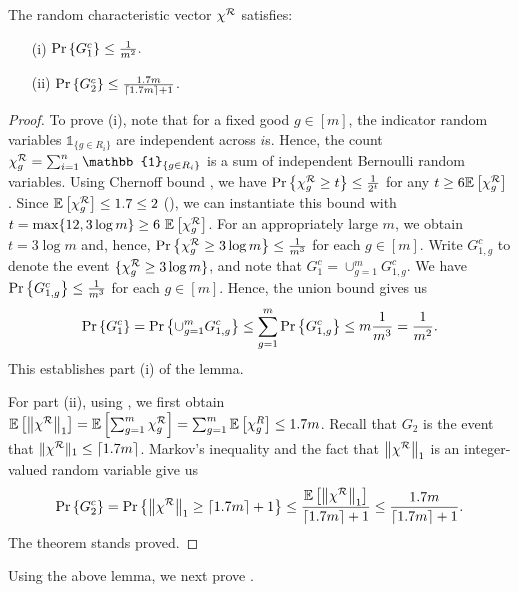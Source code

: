 \begin{lemma}
\label{lem:linftynormforb} 
The random characteristic vector $\chi^{\mathcal{R}}$ satisfies: 
\begin{enumerate}
    \item[(i)] $\Pr \left\{G_1^c\right\} \leq \frac{1}{m^{2}}.$
    \item[(ii)] $\Pr \left\{G_2^c\right\} \leq \frac{1.7m}{ \lceil1.7m\rceil+1}$.
\end{enumerate}
\end{lemma}
\begin{proof} 
To prove (i), note that for a fixed good $g\in [m]$, the indicator random variables $\mathbb{1}_{\{g\in R_i\}}$ are independent across $i$s. Hence, the count $\chi^\calR_g=\sum_{i=1}^n \mathbb{1}_{\{g\in R_i\}}$ is a sum of independent Bernoulli random variables. Using Chernoff bound \cite[Theorem 4.4]{mitzenmacher2017probability}, we have $\Pr \left\{\chi^{\mathcal{R}}_g \geq t\right\} \leq \frac{1}{2^t}$ for any $t \geq 6 \mathbb{E}\left[\chi^{\mathcal{R}}_g\right]$. Since $\mathbb{E}\left[\chi^{\mathcal{R}}_g\right] \leq 1.7 \leq 2$ (), we can instantiate this bound with $t = \max \{12, 3 \log m \} \geq   6 \ \mathbb{E}\left[\chi^{\mathcal{R}}_g\right]$. For an appropriately large $m$, we obtain $ t = 3 \log m$ and, hence, $\Pr \left\{\chi^{\mathcal{R}}_g \geq 3 \log m\right\} \leq \frac{1}{m^{3}}$ for each $g\in [m]$. Write $G_{1,g}^c$ to denote the event $\{\chi^{\mathcal{R}}_g \geq 3\log m\}$, and note that $G_1^c = \cup_{g=1}^m G_{1,g}^c$. We have  $\Pr \left\{G_{1,g}^c\right\}\leq \frac{1}{m^{3}}$ for each $g\in [m]$. Hence, the union bound gives us $$\Pr \left\{G_1^c\right\} = \Pr \left\{\cup_{g=1}^m G_{1,g}^c\right\} \leq \sum_{g=1}^m \Pr \left\{G_{1,g}^c\right\} \leq m \frac{1}{m^{3}} =\frac{1}{m^{2}}.$$ This establishes part (i) of the lemma. 


For part (ii), using , we first obtain $\mathbb{E}\left[\left\|\chi^{\mathcal{R}}\right\|_1\right] 
= \mathbb{E}\left[\sum_{g=1}^m \chi^{\mathcal{R}}_g\right] 
= \sum_{g=1}^m \mathbb{E}\left[\chi^R_g\right] 
\leq 1.7m$. Recall that $G_2$ is the event that $\|\chi^{\mathcal{R}}\|_1 \leq \lceil 1.7m \rceil$. Markov's inequality and the fact that $\left\|\chi^{\mathcal{R}}\right\|_1 $ is an integer-valued random variable give us 
$$\Pr \left\{G_2^c\right\} = \Pr \left\{\left\|\chi^{\mathcal{R}}\right\|_1 \geq \lceil 1.7m \rceil + 1\right\} 
\leq \frac{\mathbb{E}\left[\left\|\chi^{\mathcal{R}}\right\|_1\right]}{ \lceil1.7m\rceil+1} 
\leq \frac{1.7m}{ \lceil1.7m\rceil+1}.$$ The theorem stands proved.
\end{proof}

Using the above lemma, we next prove .

